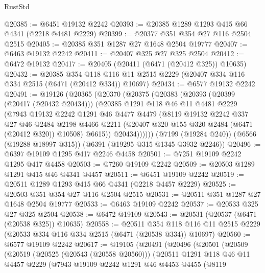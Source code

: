 \begin{lexlean}{RustStd}
\begin{coremodule}
{\begin{coremodule}
{{{{{{{{{{{{{{{{{{{{{{{{{{@20385 := @6451 @19132 @2242
@20393 := @20385 @1289 @1293 @415 @66 @4341 (@2218 @4481 @2229)
@20399 := @20377 @351 @354 @27 @116 @2504 @2515
@20405 := @20385 @351 @1287 @27 @1648 @2504 @19777
@20407 := @6463 @19132 @2242
@20411 := @20407 @325 @27 @325 @2504
@20412 := @6472 @19132
@20417 := @20405 (@20411 (@6471 (@20412 @325)) @10635)
@20432 := @20385
    @354
    @118
    @116
    @11
    @2515
    @2229
    (@20407 @334 @116 @334 @2515 (@6471 (@20412 @334)) @10697)
@20434 := @6577 @19132 @2242
@20491 := @19126
    (@20365
      (@20370
        (@20375
          (@20383
            (@20393
              (@20399 (@20417 (@20432 @20434)))
              (@20385
                @1291
                @118
                @46
                @11
                @4481
                @2229
                (@7943
                  @19132
                  @2242
                  @1291
                  @46
                  @4477
                  @4479
                  (@8119
                    @19132
                    @2242
                    @337
                    @27
                    @46
                    @2484
                    @2198
                    @4466
                    @2211
                    (@20407 @320 @155 @320 @2484 (@6471 (@20412 @320)) @10508)
                    @6615))
                @20434))))))
    (@7199 (@19284 @240))
    (@6566 (@19288 @18997 @315))
    (@6391 (@19295 @315 @1345 @3932 @2246))
@20496 := @6397 @19109 @1295 @417 @2246 @4458
@20501 := @7251 @19109 @2242 @1295 @417 @4458
@20503 := @7260 @19109 @2242
@20509 := @20503 @1289 @1291 @415 @46 @4341 @4457
@20511 := @6451 @19109 @2242
@20519 := @20511 @1289 @1293 @415 @66 @4341 (@2218 @4457 @2229)
@20525 := @20503 @351 @354 @27 @116 @2504 @2515
@20531 := @20511 @351 @1287 @27 @1648 @2504 @19777
@20533 := @6463 @19109 @2242
@20537 := @20533 @325 @27 @325 @2504
@20538 := @6472 @19109
@20543 := @20531 (@20537 (@6471 (@20538 @325)) @10635)
@20558 := @20511
    @354
    @118
    @116
    @11
    @2515
    @2229
    (@20533 @334 @116 @334 @2515 (@6471 (@20538 @334)) @10697)
@20560 := @6577 @19109 @2242
@20617 := @19105
    (@20491
      (@20496
        (@20501
          (@20509
            (@20519
              (@20525 (@20543 (@20558 @20560)))
              (@20511
                @1291
                @118
                @46
                @11
                @4457
                @2229
                (@7943
                  @19109
                  @2242
                  @1291
                  @46
                  @4453
                  @4455
                  (@8119
}}}}}}}}}}}}}}}}}}}}}}}}}}
\end{coremodule}}
\end{coremodule}
\end{lexlean}
